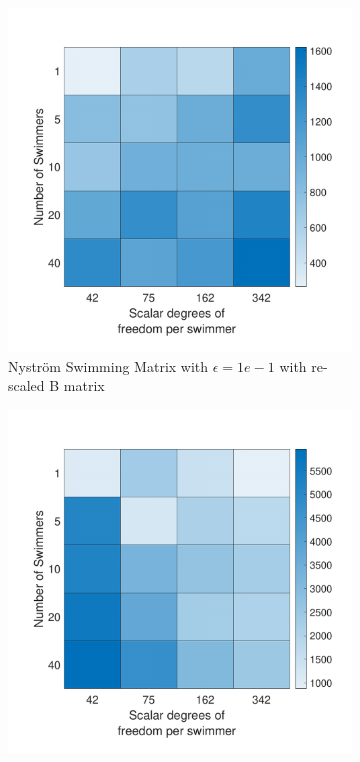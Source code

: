 \begin{figure}
\ContinuedFloat
    \begin{subfigure}{0.3\textwidth}
        \includegraphics[width=\linewidth]{Images/Condition/Mobility Matrix with rescaled total B Matrix-1.pdf}
        \caption{Nyström Swimming Matrix with $\epsilon=1e-1$ with re-scaled B matrix}
    \end{subfigure}
    \begin{subfigure}{0.3\textwidth}
        \includegraphics[width=\linewidth]{Images/Condition/Mobility Matrix with rescaled total B Matrix-2.pdf}

\end{subfigure}
\end{figure}
